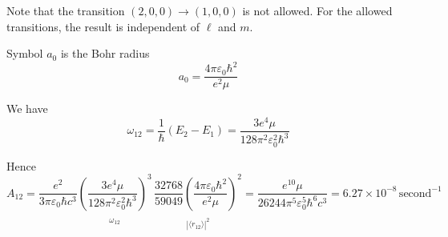 \documentclass[12pt]{article}
\begin{document}
\bigskip
\noindent
Note that the transition $(2,0,0)\rightarrow(1,0,0)$ is not allowed.
For the allowed transitions, the result is independent of $\ell$ and $m$.

\bigskip
\noindent
Symbol $a_0$ is the Bohr radius
\begin{equation*}
a_0=\frac{4\pi\varepsilon_0\hbar^2}{e^2\mu}
\end{equation*}

\bigskip
\noindent
We have
\begin{equation*}
\omega_{12}=\frac{1}{\hbar}(E_2-E_1)=\frac{3e^4\mu}{128\pi^2\varepsilon_0^2\hbar^3}
\end{equation*}

\noindent
Hence
\begin{equation*}
A_{12}=\frac{e^2}{3\pi\varepsilon_0\hbar c^3}
\underset{\substack{\\[1ex]\omega_{12}}}
{\left(\frac{3e^4\mu}{128\pi^2\varepsilon_0^2\hbar^3}\right)^3}
\,
\underset{\substack{\\[1ex]|\langle r_{12}\rangle|^2}}
{\frac{32768}{59049}\left(\frac{4\pi\varepsilon_0\hbar^2}{e^2\mu}\right)^2}
=
\frac{e^{10}\mu}{26244\pi^5\varepsilon_0^5\hbar^6 c^3}
=6.27\times10^{-8}\,\text{second}^{-1}
\end{equation*}
\end{document}
